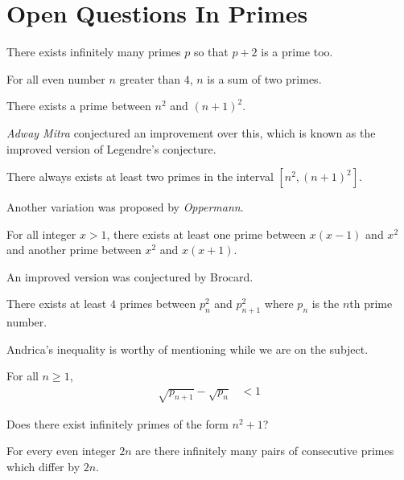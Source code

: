 \section{Open Questions In Primes}
\begin{conjecture}
	There exists infinitely many primes $p$ so that $p+2$ is a prime too.
\end{conjecture}

\begin{conjecture}
	For all even number $n$ greater than $4$, $n$ is a sum of two primes.
\end{conjecture}

\begin{conjecture}\label{open:legendre}
	There exists a prime between $n^2$ and $(n+1)^2$.
\end{conjecture}

\textit{Adway Mitra} conjectured an improvement over this, which is known as the improved version of Legendre's conjecture.
\begin{conjecture}
	There always exists at least two primes in the interval $[n^2,(n+1)^2]$.
\end{conjecture}

Another variation was proposed by \textit{Oppermann}.
\begin{conjecture}
	For all integer $x>1$, there exists at least one prime between $x(x-1)$ and $x^2$ and another prime between $x^2$ and $x(x+1)$.
\end{conjecture}
An improved version was conjectured by Brocard.
\begin{conjecture}\label{open:brocard}
	There exists at least $4$ primes between $p_n^2$ and $p_{n+1}^2$ where $p_n$ is the $n$th prime number.
\end{conjecture}
Andrica's inequality is worthy of mentioning while we are on the subject.
\begin{conjecture}
	For all $n\geq1$,
	\begin{align*}
	\sqrt{p_{n+1}}-\sqrt{p_n} & < 1
	\end{align*}
\end{conjecture}

\begin{conjecture}[$n^2+1$ Problem]
	Does there exist infinitely primes of the form $n^2+1$?
\end{conjecture}

\begin{conjecture}
	For every even integer $2n$ are there infinitely many pairs of consecutive primes which differ by $2n$.
\end{conjecture}

